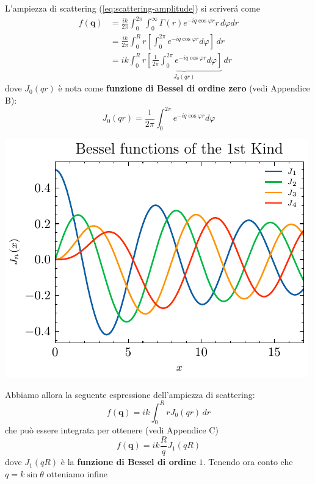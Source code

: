 L'ampiezza di scattering (\ref{eq:scattering-amplitude}) si scriverá come
\begin{align*}
	f(\bm{q}) & = \frac{ik}{2 \pi} \int_0^{2 \pi} \int_0^{\infty} \Gamma(r) e^{-iq \cos \varphi r} r \,d \varphi dr                      \\
	& = \frac{ik}{2 \pi} \int_0^R r \left[ \int_0^{2 \pi} e^{-iq \cos \varphi r} d \varphi \right] \, dr                       \\
	& = ik \int_0^R r \underbrace{\left[ \frac{1}{2 \pi}\int_0^{2 \pi} e^{-iq \cos \varphi r} d \varphi \right]}_{J_0(qr)} \, dr
\end{align*}
dove \(J_0(qr)\) è nota come \textbf{funzione di Bessel di ordine zero} (vedi Appendice B):
\[
	J_0(qr) = \frac{1}{2 \pi}\int_0^{2 \pi} e^{-iq \cos \varphi r} d \varphi
\]
\begin{marginfigure}
	\centering
	\includegraphics[width = 1.25 \textwidth, height = 1.25 \textheight]{figs/bessel-functions-1stkind}
	\label{fig:bessel-func}
\end{marginfigure}
Abbiamo allora la seguente espressione dell'ampiezza di scattering:
\begin{equation}
	f(\bm{q}) = ik \int_0^R r J_0(qr) \, dr
	\label{eq:scattering-amplitude-bessel-zero}
\end{equation}
che può essere integrata per ottenere (vedi Appendice C)
\[
	f(\bm{q}) = ik \frac{R}{q} J_1(qR)
\]
dove \(J_1(qR)\) è la \textbf{funzione di Bessel di ordine} \(1\).
Tenendo ora conto che \(q = k \sin \theta\) otteniamo infine
